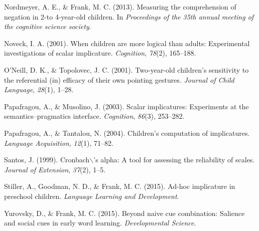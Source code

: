 \documentclass[a4paper,man,apacite,floatsintext]{apa6}
\begin{document}
Nordmeyer, A. E., \& Frank, M. C. (2013). Measuring the comprehension of
negation in 2-to 4-year-old children. In \emph{Proceedings of the 35th
annual meeting of the cognitive science society}.

Noveck, I. A. (2001). When children are more logical than adults:
Experimental investigations of scalar implicature. \emph{Cognition},
\emph{78}(2), 165--188.

O'Neill, D. K., \& Topolovec, J. C. (2001). Two-year-old children's
sensitivity to the referential (in) efficacy of their own pointing
gestures. \emph{Journal of Child Language}, \emph{28}(1), 1--28.

Papafragou, A., \& Musolino, J. (2003). Scalar implicatures: Experiments
at the semantics--pragmatics interface. \emph{Cognition}, \emph{86}(3),
253--282.

Papafragou, A., \& Tantalou, N. (2004). Children's computation of
implicatures. \emph{Language Acquisition}, \emph{12}(1), 71--82.

Santos, J. (1999). Cronbach\(\backslash\)'s alpha: A tool for assessing
the reliability of scales. \emph{Journal of Extension}, \emph{37}(2),
1--5.

Stiller, A., Goodman, N. D., \& Frank, M. C. (2015). Ad-hoc implicature
in preschool children. \emph{Language Learning and Development}.

Yurovsky, D., \& Frank, M. C. (2015). Beyond naive cue combination:
Salience and social cues in early word learning. \emph{Developmental
Science}.


\end{document}
